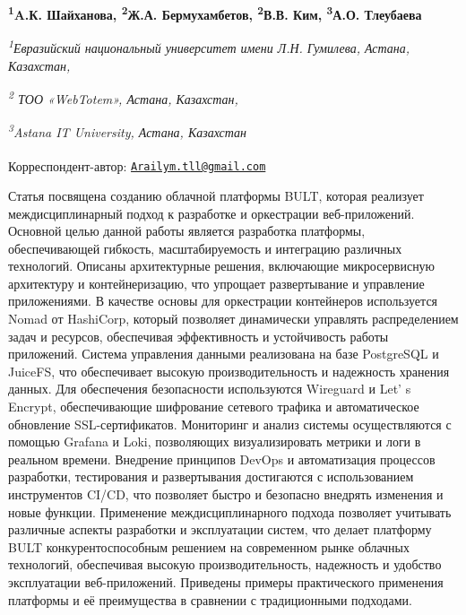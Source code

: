
\begin{articleheader}

{\bfseries
\textsuperscript{1}A.К. Шайханова\authorid,
\textsuperscript{2}Ж.А. Бермухамбетов\authorid,
\textsuperscript{2}В.В. Ким\authorid,
\textsuperscript{3}А.О. Тлеубаева\textsuperscript{\envelope } \authorid}
\end{articleheader}

\begin{affiliation}
\emph{\textsuperscript{1}Евразийский национальный университет имени Л.Н. Гумилева, Астана, Казахстан,}

\emph{\textsuperscript{2} ТОО «WebTotem», Астана, Казахстан,}

\emph{\textsuperscript{3}Astana IT University, Астана, Казахстан}

\raggedright \textsuperscript{\envelope }Корреспондент-автор: \href{mailto:Arailym.tll@gmail.com}{\nolinkurl{Arailym.tll@gmail.com}}
\end{affiliation}

Статья посвящена созданию облачной платформы BULT, которая реализует
междисциплинарный подход к разработке и оркестрации веб-приложений.
Основной целью данной работы является разработка платформы,
обеспечивающей гибкость, масштабируемость и интеграцию различных
технологий. Описаны архитектурные решения, включающие микросервисную
архитектуру и контейнеризацию, что упрощает развертывание и управление
приложениями. В качестве основы для оркестрации контейнеров используется
Nomad от HashiCorp, который позволяет динамически управлять
распределением задач и ресурсов, обеспечивая эффективность и
устойчивость работы приложений. Система управления данными реализована
на базе PostgreSQL и JuiceFS, что обеспечивает высокую
производительность и надежность хранения данных. Для обеспечения
безопасности используются Wireguard и Let' s Encrypt,
обеспечивающие шифрование сетевого трафика и автоматическое обновление
SSL-сертификатов. Мониторинг и анализ системы осуществляются с помощью
Grafana и Loki, позволяющих визуализировать метрики и логи в реальном
времени. Внедрение принципов DevOps и автоматизация процессов
разработки, тестирования и развертывания достигаются с использованием
инструментов CI/CD, что позволяет быстро и безопасно внедрять изменения
и новые функции. Применение междисциплинарного подхода позволяет
учитывать различные аспекты разработки и эксплуатации систем, что делает
платформу BULT конкурентоспособным решением на современном рынке
облачных технологий, обеспечивая высокую производительность, надежность
и удобство эксплуатации веб-приложений. Приведены примеры практического
применения платформы и её преимущества в сравнении с традиционными
подходами.

